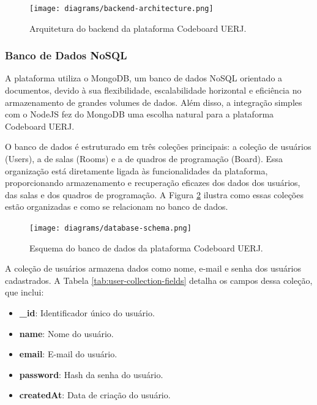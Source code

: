 \begin{figure}[H]
    \centering
    \texttt{[image: diagrams/backend-architecture.png]}
    \caption{Arquitetura do backend da plataforma Codeboard UERJ.}
    \label{fig:backend-architecture}
\end{figure}


\subsubsection{Banco de Dados NoSQL}

A plataforma utiliza o MongoDB, um banco de dados NoSQL orientado a documentos, devido à sua flexibilidade, escalabilidade horizontal e eficiência no armazenamento de grandes volumes de dados. Além disso, a integração simples com o NodeJS fez do MongoDB uma escolha natural para a plataforma Codeboard UERJ.

O banco de dados é estruturado em três coleções principais: a coleção de usuários (Users), a de salas (Rooms) e a de quadros de programação (Board). Essa organização está diretamente ligada às funcionalidades da plataforma, proporcionando armazenamento e recuperação eficazes dos dados dos usuários, das salas e dos quadros de programação. A Figura \ref{fig:database-schema} ilustra como essas coleções estão organizadas e como se relacionam no banco de dados.

\begin{figure}[H]
    \centering
    \texttt{[image: diagrams/database-schema.png]}
    \caption{Esquema do banco de dados da plataforma Codeboard UERJ.}
    \label{fig:database-schema}
\end{figure}

A coleção de usuários armazena dados como nome, e-mail e senha dos usuários cadastrados. A Tabela \ref{tab:user-collection-fields} detalha os campos dessa coleção, que inclui:

\begin{itemize}
    \item \textbf{\_id}: Identificador único do usuário.
    \item \textbf{name}: Nome do usuário.
    \item \textbf{email}: E-mail do usuário.
    \item \textbf{password}: Hash da senha do usuário.
    \item \textbf{createdAt}: Data de criação do usuário.
\end{itemize}

